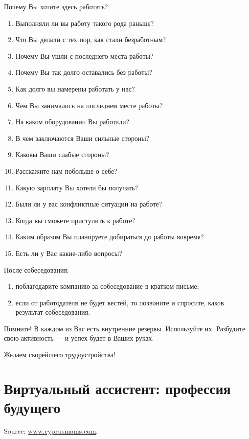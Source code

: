 Почему Вы хотите здесь работать?
\begin{enumerate}[noitemsep]
    \item Выполняли ли вы работу такого рода раньше?
    \item Что Вы делали с тех пор, как стали безработным?
    \item Почему Вы ушли с последнего места работы?
    \item Почему Вы так долго оставались без работы?
    \item Как долго вы намерены работать у нас?
    \item Чем Вы занимались на последнем месте работы?
    \item На каком оборудовании Вы работали?
    \item В чем заключаются Ваши сильные стороны?
    \item Каковы Ваши слабые стороны?
    \item Расскажите нам побольше о себе?
    \item Какую зарплату Вы хотели бы получать?
    \item Были ли у вас конфликтные ситуации на работе?
    \item Когда вы сможете приступить к работе?
    \item Каким образом Вы планируете добираться до работы вовремя?
    \item Есть ли у Вас какие-либо вопросы?
\end{enumerate}

После собеседования:
\begin{enumerate}[noitemsep]
    \item поблагодарите компанию за собеседование в кратком письме;
    \item если от работодателя не будет вестей, то позвоните и спросите, каков результат собеседования.
\end{enumerate}

Помните! В каждом из Вас есть внутренние резервы. Используйте их. Разбудите свою активность --- и успех будет в Ваших руках.

Желаем скорейшего трудоустройства!


\section{Виртуальный ассистент: профессия будущего}
Source: \href{http://www.cyprusmoms.com/virtualnyj-assistent-professiya-budushchego/}{www.cyprusmoms.com}.\\

